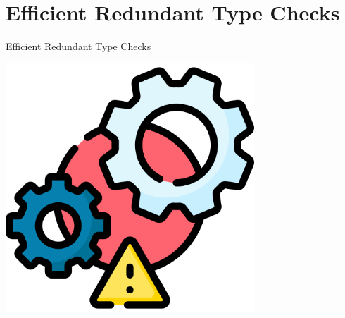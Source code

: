 \section{Efficient Redundant Type Checks}

\begin{frame}{Efficient Redundant Type Checks}
  \centering
  
    \includegraphics[width=0.7\textwidth]{inefficient.png}

\end{frame}


\newsavebox\typecaseAbox
\begin{lrbox}{\typecaseAbox}
  \begin{minipage}{8cm}
    
  \end{minipage}
\end{lrbox}

\newsavebox\typecaseITEbox
\begin{lrbox}{\typecaseITEbox}
  \begin{minipage}{8cm}
    
  \end{minipage}
\end{lrbox}

\newsavebox\typecaseITEafterbox
\begin{lrbox}{\typecaseITEafterbox}
  \begin{minipage}{8cm}

  \end{minipage}
\end{lrbox}

\newsavebox\typecaseBabox
\begin{lrbox}{\typecaseBabox}
  \begin{minipage}{8cm}

  \end{minipage}
\end{lrbox}

